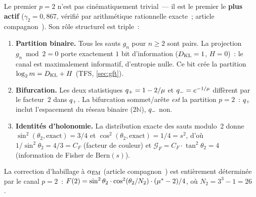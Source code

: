 \documentclass[12pt,a4paper]{article}
\begin{document}
\begin{remarque}[L'opérateur info/anti-info $p = 2$]
\label{rem:p2_operator}
Le premier $p = 2$ n'est pas cinématiquement trivial~--- il est le
premier le \textbf{plus actif} ($\gamma_2 = 0{,}867$, vérifié par
arithmétique rationnelle exacte~; article
compagnon~\cite{companion_M3}). Son rôle structurel est triple~:
\begin{enumerate}[nosep]
\item \textbf{Partition binaire.} Tous les sauts $g_n$ pour
  $n \geq 2$ sont pairs. La projection $g_n \bmod 2 = 0$ porte
  exactement $1$ bit d'information ($D_{\mathrm{KL}} = 1$, $H = 0$)~: le canal
  est maximalement informatif, d'entropie nulle. Ce bit crée la
  partition $\log_2 m = D_{\mathrm{KL}} + H$ (TFS, \cref{sec:gft}).
\item \textbf{Bifurcation.} Les deux statistiques
  $q_{+} = 1 - 2/\mu$ et $q_{-} = e^{-1/\mu}$ diffèrent par le
  facteur~$2$ dans $q_{+}$. La bifurcation sommet/arête \emph{est}
  la partition $p = 2$~: $q_{+}$ inclut l'espacement du réseau
  binaire ($2\mathbb{N}$), $q_{-}$ non.
\item \textbf{Identités d'holonomie.} La distribution exacte des sauts
  modulo~2 donne $\sin^2(\theta_2, \text{exact}) = 3/4$ et
  $\cos^2(\theta_2, \text{exact}) = 1/4 = s^2$, d'où
  $1/\sin^2\theta_2 = 4/3 = C_F$ (facteur de couleur) et
  $\mathcal{G}_F = C_F \cdot \tan^2\theta_2 = 4$ (information de
  Fisher de $\mathrm{Bern}(s)$).
\end{enumerate}
La correction d'habillage à $\alpha_{\rm EM}$ (article
compagnon~\cite{companion_M5}) est entièrement déterminée par le
canal $p = 2$~: $F(2) = \sin^2\theta_2 \cdot \cos^2(\theta_2/N_2)
\cdot ({\mu^{*}} - 2)/4$, où $N_2 = 3^3 - 1 = 26$.
\end{remarque}
\end{document}
